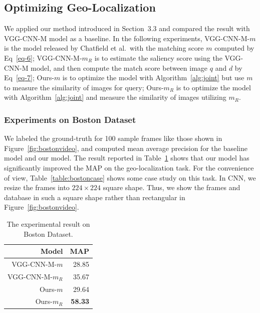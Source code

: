 \subsection{Optimizing Geo-Localization}
\par
We applied our method introduced in Section~3.3 and compared the result with VGG-CNN-M model as a baseline. In the following experiments, VGG-CNN-M-$m$ is the model released by Chatfield et al.~\cite{chatfield2014return}with the matching score $m$ computed by Eq~\eqref{eq-6}; VGG-CNN-M-$m_R$ is to estimate the saliency score using the VGG-CNN-M model, and then compute the match score between image $q$ and $d$ by Eq~\eqref{eq-7}; Ours-$m$ is to optimize the model with Algorithm~\ref{alg:joint} but use $m$ to measure the similarity of images for query; Ours-$m_R$ is to optimize the model with Algorithm~\ref{alg:joint} and measure the similarity of images utilizing $m_R$. 
\subsubsection{Experiments on Boston Dataset}
\par
We labeled the ground-truth for 100 sample frames like those shown in Figure~\ref{fig:bostonvideo}, and computed mean average precision for the baseline model and our model. The result reported in Table~\ref{table:bostonresult} shows that our model has significantly improved the MAP on the geo-localization task. For the convenience of view, Table~\ref{table:bostoncase} shows some case study on this task. In CNN, we resize the frames into $224 \times 224$ square shape. Thus, we show the frames and database in such a square shape rather than rectangular in Figure~\ref{fig:bostonvideo}.
\begin{table}[htbp]
\begin{tabular}{|r|r|}
\hline
Model & MAP \\
\hline \hline
VGG-CNN-M-$m$ & 28.85\\
VGG-CNN-M-$m_R$ & 35.67 \\
Ours-$m$ & 29.64 \\
Ours-$m_R$ & \textbf{58.33} \\
\hline
\end{tabular}
\caption{The experimental result on Boston Dataset.}
\label{table:bostonresult}
\end{table}

